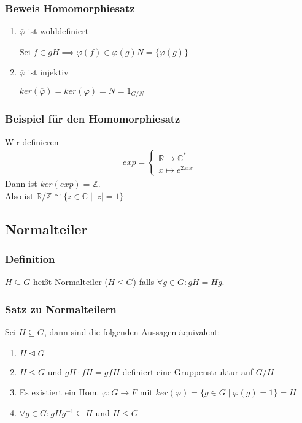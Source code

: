 \documentclass[12pt, german]{article}
\begin{document}
\subsubsection{Beweis Homomorphiesatz}
	\begin{enumerate}[label=\arabic*)]
		\item $\overline{\varphi}$ ist wohldefiniert ~\par
				Sei $f\in gH \implies \varphi(f) \in \varphi(g)N = \{\varphi(g)\}$
		
		\item $\overline{\varphi}$ ist injektiv ~\par
			$ker(\overline{\varphi}) = ker(\varphi) = N = 1_{G/N}$
	\end{enumerate}

\subsubsection{Beispiel für den Homomorphiesatz}
	Wir definieren 
		\begin{align*}
			exp = \begin{cases}
			\mathbb{R} \to \mathbb{C}^\ast\\
			x \mapsto e^{2\pi i x}
			\end{cases}
		\end{align*}
	Dann ist $ker(exp) = \mathbb Z $.\\ 
	 Also ist $\mathbb R / \mathbb Z \cong \{z \in \mathbb C \mid |z| = 1\}$	



\subsection{Normalteiler}		
\subsubsection{Definition}
	$H \subseteq G$ heißt Normalteiler ($H\trianglelefteq G$) falls $\forall g \in G : gH = Hg$. 

\subsubsection{Satz zu Normalteilern}
	Sei $H \subseteq G$, dann sind die folgenden Aussagen äquivalent: 
	\begin{enumerate}[label=\arabic*)]
		\item $H\trianglelefteq G$
		\item $H \leq G$ und $gH \cdot fH = gfH$ definiert eine Gruppenstruktur auf $G/H$
		\item Es existiert ein Hom. $\varphi: G \to F$ mit $ker(\varphi) = \{g \in G \mid \varphi(g)= 1\} = H$
		\item $\forall g \in G : gHg^{-1} \subseteq H$ und $H \leq G$
	\end{enumerate}
\end{document}
